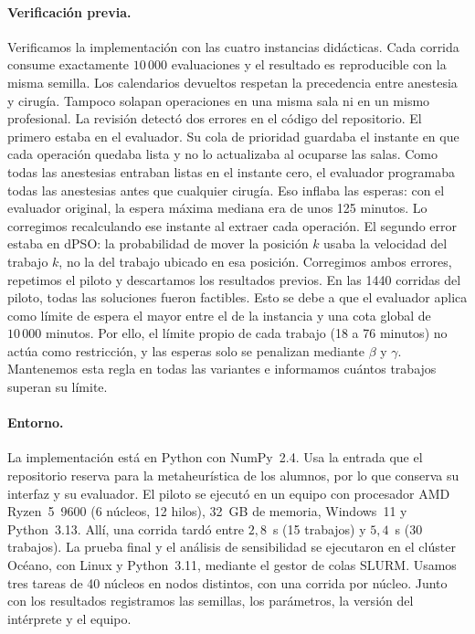 \documentclass[10pt,a4paper]{article}
\newcommand{\dc}{{,}}%
\begin{document}
\paragraph{Verificación previa.}
Verificamos la implementación con las cuatro instancias didácticas. Cada corrida consume
exactamente $10\,000$ evaluaciones y el resultado es reproducible con la misma semilla. Los
calendarios devueltos respetan la precedencia entre anestesia y cirugía. Tampoco solapan
operaciones en una misma sala ni en un mismo profesional. La revisión detectó dos errores en el
código del repositorio. El primero estaba en el evaluador. Su cola de prioridad guardaba el
instante en que cada operación quedaba lista y no lo actualizaba al ocuparse las salas. Como
todas las anestesias entraban listas en el instante cero, el evaluador programaba todas las
anestesias antes que cualquier cirugía. Eso inflaba las esperas: con el evaluador original, la
espera máxima mediana era de unos 125 minutos. Lo corregimos recalculando ese instante al
extraer cada operación. El segundo error estaba en dPSO: la probabilidad de mover la posición
$k$ usaba la velocidad del trabajo $k$, no la del trabajo ubicado en esa posición. Corregimos
ambos errores, repetimos el piloto y descartamos los resultados previos. En las 1440 corridas
del piloto, todas las soluciones fueron factibles. Esto se debe a que el evaluador aplica como
límite de espera el mayor entre el de la instancia y una cota global de $10\,000$ minutos. Por
ello, el límite propio de cada trabajo (18 a 76 minutos) no actúa como restricción, y las
esperas solo se penalizan mediante $\beta$ y $\gamma$. Mantenemos esta regla en todas las
variantes e informamos cuántos trabajos superan su límite.

\paragraph{Entorno.}
La implementación está en Python con NumPy~2.4. Usa la entrada que el repositorio reserva
para la metaheurística de los alumnos, por lo que conserva su interfaz y su evaluador. El piloto
se ejecutó en un equipo con procesador AMD Ryzen~5~9600 (6 núcleos, 12 hilos), 32~GB de memoria,
Windows~11 y Python~3.13. Allí, una corrida tardó entre $2\dc8$~s (15 trabajos) y $5\dc4$~s (30
trabajos). La prueba final y el análisis de sensibilidad se ejecutaron en el clúster Océano, con
Linux y Python~3.11, mediante el gestor de colas SLURM. Usamos tres tareas de 40 núcleos en
nodos distintos, con una corrida por núcleo. Junto con los resultados registramos las semillas,
los parámetros, la versión del intérprete y el equipo.
\end{document}
